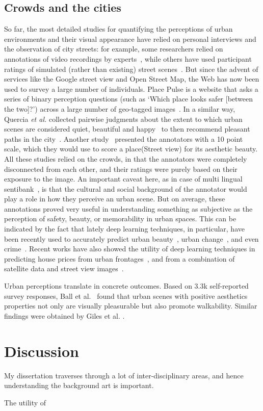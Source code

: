 \subsection{Crowds and the cities}
So far, the most detailed studies for quantifying the perceptions of urban environments and their visual appearance have relied on personal interviews and the observation of city streets: for example, some researchers relied on annotations of video recordings by experts~\cite{sampson04seeing}, while others have used participant ratings of simulated (rather than existing) street scenes~\cite{lindal2012}. 
But since the advent of services like the Google street view and Open Street Map, the Web has now been used to survey a large number of individuals. Place Pulse is a website that asks a series of binary perception questions (such as `Which place looks safer [between the two]?') across a large number of geo-tagged images~\cite{salesses2013collaborative}. In a similar way, Quercia \emph{et al.} collected pairwise judgments about the extent to which urban scenes are considered quiet, beautiful and happy~\cite{quercia2014aesthetic} to then recommend pleasant paths in the city~\cite{quercia2014shortest}. Another study~\cite{seresinhe2015quantifying} presented the annotators with a 10 point scale, which they would use to score a place(Street view) for its aesthetic beauty. 
All these studies relied on the crowds, in that the annotators were completely disconnected from each other, and their ratings were purely based on their exposure to the image. An important caveat here, as in case of multi lingual sentibank~\cite{pappas2016multilingual}, is that the cultural and social background of the annotator would play a role in how they perceive an urban scene.
But on average, these annotations proved very useful in understanding something as subjective as the perception of safety, beauty, or memorability in urban spaces. This can be indicated by the fact that lately deep learning techniques, in particular, have been recently used to accurately predict urban beauty~\cite{dubey2016deep,seresinhe2017using}, urban change~\cite{naik2017computer}, and even crime~\cite{DeNadai16,arietta2014city}.  Recent works have also showed the utility of deep learning techniques in predicting house prices from urban frontages~\cite{frontage}, and from a combination of satellite data and street view images~\cite{law2018take}.

Urban perceptions translate in concrete outcomes. Based on 3.3k self-reported survey responses,  Ball et al.~\cite{ball2001perceived} found that urban scenes with positive aesthetics properties  not only are visually  pleasurable but also promote walkability. Similar findings were obtained by Giles et al. \cite{giles2005increasing}. 

\section{Discussion}

My dissertation traverses through a lot of inter-disciplinary areas, and hence understanding the background art is important. 

The utility of 
